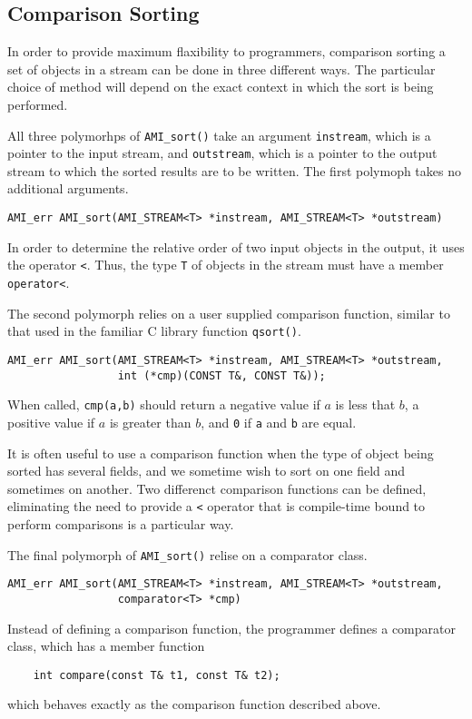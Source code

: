 \subsection{Comparison Sorting}
\label{sec:ref-ami-sort}


In order to provide maximum flaxibility to programmers, comparison
sorting a set of objects in a stream can be done in three different
ways.  The particular choice of method will depend on the exact
context in which the sort is being performed.

All three polymorhps of \verb|AMI_sort()| take an argument
\verb|instream|, which is a pointer to the input stream, and
\verb|outstream|, which is a pointer to the output stream to which the
sorted results are to be written.
The first polymoph takes no additional arguments.  
\begin{verbatim}
AMI_err AMI_sort(AMI_STREAM<T> *instream, AMI_STREAM<T> *outstream)
\end{verbatim}
In order to
determine the relative order of two input objects in the output, it
uses the operator \verb|<|.  Thus, the type \verb|T| of objects in the
stream must have a member \verb|operator<|. 

The second polymorph relies on a user supplied comparison function,
similar to that used in the familiar C library function \verb|qsort()|.
\begin{verbatim}
AMI_err AMI_sort(AMI_STREAM<T> *instream, AMI_STREAM<T> *outstream,
                 int (*cmp)(CONST T&, CONST T&));
\end{verbatim}
When called, \verb|cmp(a,b)| should return a negative value if $a$ is
less that $b$, a positive value if $a$ is greater than $b$, and
\verb|0| if \verb|a| and \verb|b| are equal.

It is often useful to use a comparison function when the type of
object being sorted has several fields, and we sometime wish to sort
on one field and sometimes on another.  Two differenct comparison
functions can be defined, eliminating the need to provide a \verb|<|
operator that is compile-time bound to perform comparisons is a
particular way.

The final polymorph of \verb|AMI_sort()| relise on a comparator class.
\begin{verbatim}
AMI_err AMI_sort(AMI_STREAM<T> *instream, AMI_STREAM<T> *outstream,
                 comparator<T> *cmp)
\end{verbatim}
Instead of defining a comparison function, the programmer defines a
comparator class, which has a member function 
\begin{verbatim}
    int compare(const T& t1, const T& t2);
\end{verbatim}
which behaves exactly as the comparison function described above.

